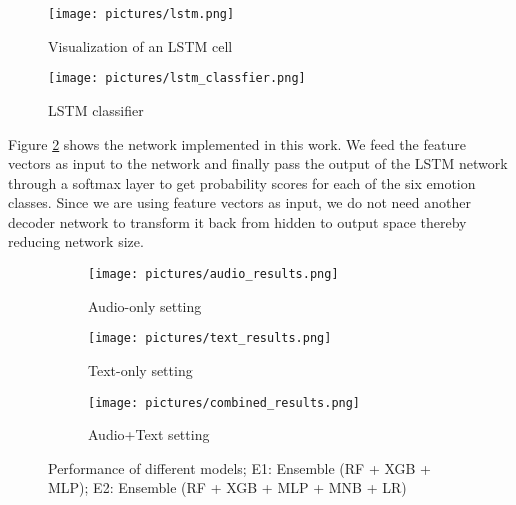 \documentclass[conference]{IEEEtran}
\begin{document}
\begin{figure}[h]
	\centering
	\texttt{[image: pictures/lstm.png]}
	\caption{Visualization of an LSTM cell}
	\label{fig:lstm}
\end{figure}

\begin{figure}[h!]
	\centering
	\texttt{[image: pictures/lstm\_classfier.png]}
	\caption{LSTM classifier}
	\label{fig:lstm_classifier}
\end{figure}

Figure \ref{fig:lstm_classifier} shows the network implemented in this work. We feed the feature vectors as input to the network and finally pass the output of the LSTM network through a softmax layer to get probability scores for each of the six emotion classes. Since we are using feature vectors as input, we do not need another decoder network to transform it back from hidden to output space thereby reducing network size.

\begin{figure}
    \centering
    \begin{subfigure}[ht]{\linewidth}
    	\centering
    	\texttt{[image: pictures/audio\_results.png]}
    	\caption{Audio-only setting}
    	\label{fig:aud_res}
    \end{subfigure}

    \begin{subfigure}[ht]{\linewidth}
        \centering
    	\texttt{[image: pictures/text\_results.png]}
    	\caption{Text-only setting}
    	\label{fig:tex_res}
    \end{subfigure}

    \begin{subfigure}[ht]{\linewidth}
        \centering
    	\texttt{[image: pictures/combined\_results.png]}
    	\caption{Audio+Text setting}
    	\label{fig:com_res}
\end{subfigure}
    \caption{Performance of different models; E1: Ensemble (RF + XGB + MLP); E2: Ensemble (RF + XGB + MLP + MNB + LR)}
    \label{fig:performance}
\end{figure}
\end{document}
